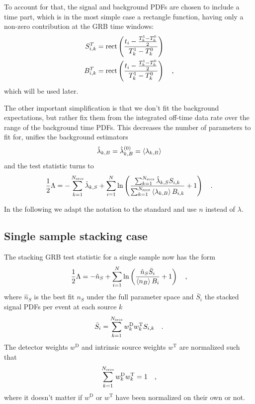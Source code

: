 To account for that, the signal and background PDFs are chosen to include a time part, which is in the most simple case a rectangle function, having only a non-zero contribution at the GRB time windows:
\begin{align}
  S_{i,k}^T &= \operatorname{rect}\left(\frac{t_i - \frac{T_k^1-T_k^0}{2}}
                              {T_k^1-T_k^0}\right) \\
  B_{i,k}^T &= \operatorname{rect}\left(\frac{t_i - \frac{T_k^1-T_k^0}{2}}
                              {T_k^1-T_k^0}\right)
  \quad\text{,}
\end{align}
which will be used later.

The other important simplification is that we don't fit the background expectations, but rather fix them from the integrated off-time data rate over the range of the background time PDFs.
This decreases the number of parameters to fit for, unifies the background estimators
\begin{equation}
  \hat{\lambda}_{k,B} = \hat{\lambda}_{k,B}^{(0)} = \Braket{\lambda_{k,B}}
\end{equation}
and the test statistic turns to
\begin{equation}
  \frac{1}{2}\Lambda
  = -\sum_{k=1}^{N_\text{srcs}}\hat{\lambda}_{k,S} +
    \sum_{i=1}^N \ln\left(
      \frac{\sum_{k=1}^{N_\text{srcs}}\hat{\lambda}_{k,S} S_{i,k}}
           {\sum_{k=1}^{N_\text{srcs}}\Braket{\lambda_{k,B}} B_{i,k}}
      + 1 \right)
  \quad\text{.}
\end{equation}

In the following we adapt the notation to the standard and use $n$ instead of $\lambda$.


\subsection{Single sample stacking case}

The stacking GRB test statistic for a single sample now has the form
\begin{align}
  \frac{1}{2}\Lambda
  = -\hat{n}_S + \sum_{i=1}^N \ln\left(\frac{\hat{n}_S\bar{S}_i}{\Braket{n_B} B_i} + 1\right) \quad\text{,}
\label{equ:TS}
\end{align}
where $\hat{n}_S$ is the best fit $n_S$ under the full parameter space and $\bar{S}_i$ the stacked signal PDFs per event at each source $k$
\begin{equation}
  \bar{S}_i = \sum_{k=1}^{N_\text{srcs}} w_k^\text{D} w_k^\text{T} S_{i,k} \quad\text{.}
\end{equation}
The detector weights $w^\text{D}$ and intrinsic source weights $w^\text{T}$ are normalized such that
\begin{equation}
  \sum_{k=1}^{N_\text{srcs}} w^\text{D}_k w^\text{T}_k = 1 \quad\text{,}
\end{equation}
where it doesn't matter if $w^\text{D}$ or $w^\text{T}$ have been normalized on their own or not.


